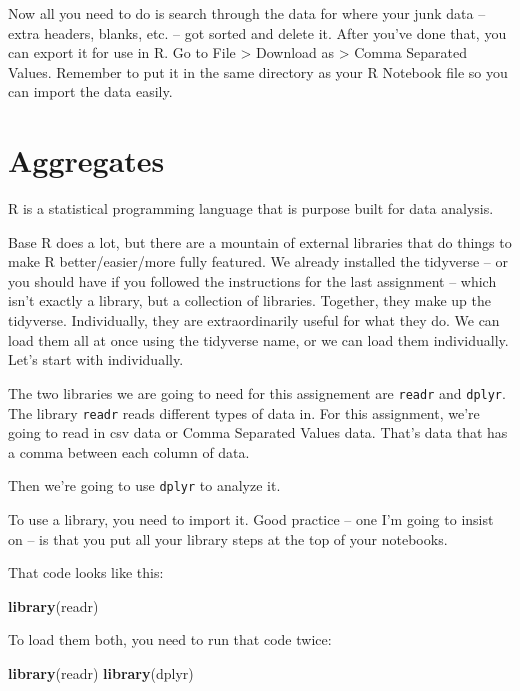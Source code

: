 \documentclass[]{book}
\newenvironment{Shaded}{\begin{snugshade}}{\end{snugshade}}
\newcommand{\KeywordTok}[1]{\textcolor[rgb]{0.13,0.29,0.53}{\textbf{#1}}}
\newcommand{\NormalTok}[1]{#1}
\begin{document}
Now all you need to do is search through the data for where your junk
data -- extra headers, blanks, etc. -- got sorted and delete it. After
you've done that, you can export it for use in R. Go to File
\textgreater{} Download as \textgreater{} Comma Separated Values.
Remember to put it in the same directory as your R Notebook file so you
can import the data easily.

\chapter{Aggregates}\label{aggregates}

R is a statistical programming language that is purpose built for data
analysis.

Base R does a lot, but there are a mountain of external libraries that
do things to make R better/easier/more fully featured. We already
installed the tidyverse -- or you should have if you followed the
instructions for the last assignment -- which isn't exactly a library,
but a collection of libraries. Together, they make up the tidyverse.
Individually, they are extraordinarily useful for what they do. We can
load them all at once using the tidyverse name, or we can load them
individually. Let's start with individually.

The two libraries we are going to need for this assignement are
\texttt{readr} and \texttt{dplyr}. The library \texttt{readr} reads
different types of data in. For this assignment, we're going to read in
csv data or Comma Separated Values data. That's data that has a comma
between each column of data.

Then we're going to use \texttt{dplyr} to analyze it.

To use a library, you need to import it. Good practice -- one I'm going
to insist on -- is that you put all your library steps at the top of
your notebooks.

That code looks like this:

\begin{Shaded}
\begin{Highlighting}[]
\KeywordTok{library}\NormalTok{(readr)}
\end{Highlighting}
\end{Shaded}

To load them both, you need to run that code twice:

\begin{Shaded}
\begin{Highlighting}[]
\KeywordTok{library}\NormalTok{(readr)}
\KeywordTok{library}\NormalTok{(dplyr)}
\end{Highlighting}
\end{Shaded}
\end{document}
